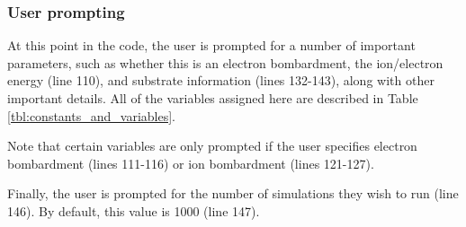 \documentclass[10pt, reqno]{exam}
\begin{document}
\subsubsection{User prompting}

At this point in the code, the user is prompted for a number of important parameters, such as whether this is an electron bombardment, the ion/electron energy (line 110), and substrate information (lines 132-143), along with other important details. All of the variables assigned here are described in Table \ref{tbl:constants_and_variables}. \par

Note that certain variables are only prompted if the user specifies electron bombardment (lines 111-116) or ion bombardment (lines 121-127). \par

Finally, the user is prompted for the number of simulations they wish to run (line 146). By default, this value is 1000 (line 147). \par
\end{document}
